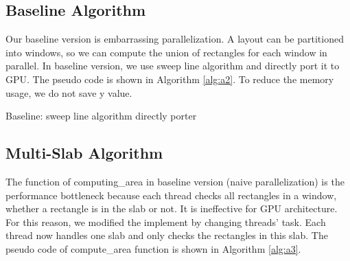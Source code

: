 \subsection{Baseline Algorithm}
Our baseline version is embarrassing parallelization. A layout can be partitioned into windows, so we can compute the union of rectangles for each window in parallel. In baseline version, we use sweep line algorithm and directly port it to GPU. The pseudo code is shown in Algorithm \ref{alg:a2}. To reduce the memory usage, we do not save y value. 

\begin{algorithm}[H]
\label{alg:a2}
\caption{Baseline: sweep line algorithm directly porter}
\DontPrintSemicolon
\renewcommand\baselinestretch{0.7}\selectfont
 \;
\end{algorithm}

\subsection{Multi-Slab Algorithm}
The function of computing\_area in baseline version (naive parallelization) is the performance bottleneck because each thread checks all rectangles in a window, whether a rectangle is in the slab or not. It is ineffective for GPU architecture. For this reason, we modified the implement by changing threads' task. Each thread now handles one slab and only checks the rectangles in this slab. The pseudo code of compute\_area function is shown in Algorithm \ref{alg:a3}.

